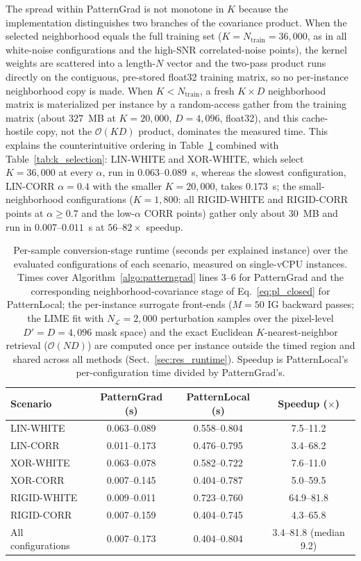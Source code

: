 \documentclass[pdflatex,sn-mathphys-num]{sn-jnl}
\theoremstyle{thmstyleone}
\theoremstyle{thmstyletwo}%
\theoremstyle{thmstylethree}%
\begin{document}
The spread within PatternGrad is not monotone in $K$ because the implementation distinguishes two branches of the covariance product. When the selected neighborhood equals the full training set ($K = N_{\text{train}} = 36{,}000$, as in all white-noise configurations and the high-SNR correlated-noise points), the kernel weights are scattered into a length-$N$ vector and the two-pass product runs directly on the contiguous, pre-stored float32 training matrix, so no per-instance neighborhood copy is made. When $K < N_{\text{train}}$, a fresh $K \times D$ neighborhood matrix is materialized per instance by a random-access gather from the training matrix (about $327$~MB at $K = 20{,}000$, $D = 4{,}096$, float32), and this cache-hostile copy, not the $\mathcal{O}(KD)$ product, dominates the measured time. This explains the counterintuitive ordering in Table~\ref{tab:runtime} combined with Table~\ref{tab:k_selection}: LIN-WHITE and XOR-WHITE, which select $K = 36{,}000$ at every $\alpha$, run in $0.063$--$0.089$~s, whereas the slowest configuration, LIN-CORR $\alpha = 0.4$ with the smaller $K = 20{,}000$, takes $0.173$~s; the small-neighborhood configurations ($K = 1{,}800$: all RIGID-WHITE and RIGID-CORR points at $\alpha \ge 0.7$ and the low-$\alpha$ CORR points) gather only about $30$~MB and run in $0.007$--$0.011$~s at $56$--$82\times$ speedup.

\begin{table}[t]
\centering
\caption{Per-sample conversion-stage runtime (seconds per explained instance) over the evaluated configurations of each scenario, measured on single-vCPU instances. Times cover Algorithm~\ref{algo:patterngrad} lines 3--6 for PatternGrad and the corresponding neighborhood-covariance stage of Eq.~\eqref{eq:pl_closed} for PatternLocal; the per-instance surrogate front-ends ($M = 50$ IG backward passes; the LIME fit with $N_{\mathcal{L}} = 2{,}000$ perturbation samples over the pixel-level $D' = D = 4{,}096$ mask space) and the exact Euclidean $K$-nearest-neighbor retrieval ($\mathcal{O}(ND)$) are computed once per instance outside the timed region and shared across all methods (Sect.~\ref{sec:res_runtime}). Speedup is PatternLocal's per-configuration time divided by PatternGrad's.}
\label{tab:runtime}
\begin{tabular}{lccc}
\toprule
\textbf{Scenario} & \textbf{PatternGrad (s)} & \textbf{PatternLocal (s)} & \textbf{Speedup ($\times$)} \\
\midrule
LIN-WHITE  & 0.063--0.089 & 0.558--0.804 & 7.5--11.2 \\
LIN-CORR   & 0.011--0.173 & 0.476--0.795 & 3.4--68.2 \\
XOR-WHITE  & 0.063--0.078 & 0.582--0.722 & 7.6--11.0 \\
XOR-CORR   & 0.007--0.145 & 0.404--0.787 & 5.0--59.5 \\
RIGID-WHITE & 0.009--0.011 & 0.723--0.760 & 64.9--81.8 \\
RIGID-CORR & 0.007--0.159 & 0.404--0.745 & 4.3--65.8 \\
\midrule
All configurations & 0.007--0.173 & 0.404--0.804 & 3.4--81.8 (median 9.2) \\
\bottomrule
\end{tabular}
\end{table}
\end{document}
